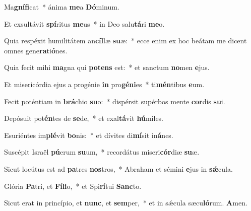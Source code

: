 \item Ma\textbf{gnífi}cat~* ánima \textbf{me}a \textbf{Dó}minum.

\item Et exsultávit \textbf{spí}ritus \textbf{me}us~* in Deo salu\textbf{tá}ri \textbf{me}o.

\item Quia respéxit humilitátem an\textbf{cíl}læ \textbf{su}æ:~* ecce enim ex hoc beátam me dicent omnes gene\textbf{ra}ti\textbf{ó}nes.

\item Quia fecit mihi \textbf{ma}gna qui \textbf{potens} est:~* et sanctum \textbf{no}men \textbf{e}jus.

\item Et misericórdia ejus a progénie \textbf{in} pro\textbf{géni}es~* ti\textbf{mén}tibus \textbf{e}um.

\item Fecit poténtiam in \textbf{brá}chio \textbf{su}o:~* dispérsit supérbos mente \textbf{cor}dis \textbf{su}i.

\item Depósuit pot\textbf{én}tes de \textbf{se}de,~* et exal\textbf{tá}vit \textbf{hú}miles.

\item Esuriéntes im\textbf{plé}vit \textbf{bo}nis:~* et dívites di\textbf{mí}sit in\textbf{á}nes.

\item Suscépit Israël \textbf{pú}erum \textbf{su}um,~* recordátus miseri\textbf{cór}diæ \textbf{su}æ.

\item Sicut locútus est ad \textbf{pa}tres \textbf{nos}tros,~* Abraham et sémini \textbf{e}jus in \textbf{sǽ}cula.

\item Glória \textbf{Pa}tri, et \textbf{Fíli}o,~* et Spi\textbf{rí}tui \textbf{Sanc}to.

\item Sicut erat in princípio, et \textbf{nunc}, et \textbf{sem}per,~* et in sǽcula sæcu\textbf{ló}rum. \textbf{A}men.